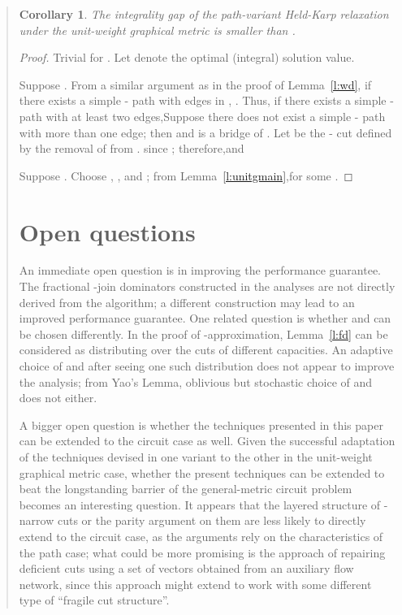 \documentclass[11pt,letterpaper]{article}
\newtheorem{cor}{Corollary}
\newcommand{\st}{\mbox{-} }
\begin{document}
\begin{quote}
\begin{cor}
The integrality gap of the path-variant Held-Karp relaxation under the unit-weight graphical metric is smaller than .
\end{cor}
\begin{proof}
Trivial for . Let  denote the optimal (integral) solution value.

Suppose . From a similar argument as in the proof of Lemma~\ref{l:wd}, if there exists a simple \st path with  edges in , . Thus, if there exists a simple \st path with at least two edges,Suppose there does not exist a simple \st path with more than one edge; then  and  is a bridge of . Let  be the \st cut defined by the removal of  from .  since ; therefore,and

Suppose . Choose , , and ; from Lemma~\ref{l:unitgmain},for some .
\end{proof}

\section{Open questions}\label{s:oq}

An immediate open question is in improving the performance guarantee. The fractional -join dominators constructed in the analyses are not directly derived from the algorithm; a different construction may lead to an improved performance guarantee. One related question is whether  and  can be chosen differently. In the proof of -approximation, Lemma~\ref{l:fd} can be considered as distributing  over the cuts of different capacities. An adaptive choice of  and  after seeing one such distribution does not appear to improve the analysis; from Yao's Lemma, oblivious but stochastic choice of  and  does not either.

A bigger open question is whether the techniques presented in this paper can be extended to the circuit case as well. Given the successful adaptation of the techniques devised in one variant to the other in the unit-weight graphical metric case, whether the present techniques can be extended to beat the longstanding  barrier of the general-metric circuit problem becomes an interesting question. It appears that the layered structure of -narrow cuts or the parity argument on them are less likely to directly extend to the circuit case, as the arguments rely on the characteristics of the path case; what could be more promising is the approach of repairing deficient cuts using a set of vectors obtained from an auxiliary flow network, since this approach might extend to work with some different type of ``fragile cut structure''.


\end{quote}
\end{document}
